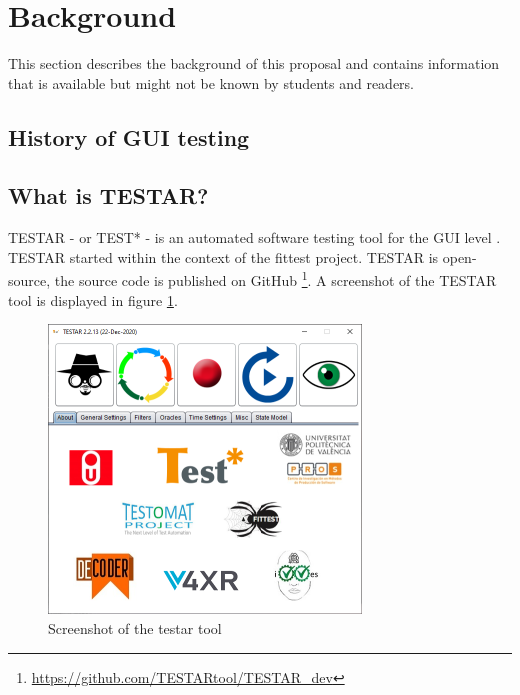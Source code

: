 \section{Background} \label{background}
    This section describes the background of this proposal and contains information that is available but might not be known by students and readers. 
    

\subsection{History of GUI testing}






\subsection{What is TESTAR?}
    TESTAR - or TEST* - is an automated software testing tool for the GUI level \cite{testar-about}. TESTAR started within the context of the \acrfull{fittest} project. TESTAR is open-source, the source code is published on GitHub \footnote{ \url{https://github.com/TESTARtool/TESTAR\_dev}}. A screenshot of the TESTAR tool is displayed in figure \ref{fig:testar}.
    
    \begin{figure}[h]
        \includegraphics{pics/testar.png}
        \caption{Screenshot of the testar tool}
        \label{fig:testar}
    \end{figure}
    
